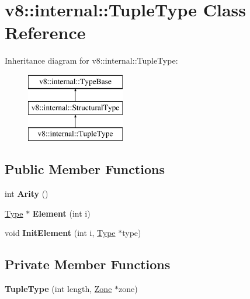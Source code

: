 \hypertarget{classv8_1_1internal_1_1_tuple_type}{}\section{v8\+:\+:internal\+:\+:Tuple\+Type Class Reference}
\label{classv8_1_1internal_1_1_tuple_type}
Inheritance diagram for v8\+:\+:internal\+:\+:Tuple\+Type\+:\begin{figure}[H]
\begin{center}
\leavevmode
\includegraphics[height=3.000000cm]{classv8_1_1internal_1_1_tuple_type}
\end{center}
\end{figure}
\subsection*{Public Member Functions}
\begin{DoxyCompactItemize}
\item 
int {\bfseries Arity} ()\hypertarget{classv8_1_1internal_1_1_tuple_type_acf485a5f8190e56ef98b38aab2015551}{}\label{classv8_1_1internal_1_1_tuple_type_acf485a5f8190e56ef98b38aab2015551}

\item 
\hyperlink{classv8_1_1internal_1_1_type}{Type} $\ast$ {\bfseries Element} (int i)\hypertarget{classv8_1_1internal_1_1_tuple_type_a410703a0815a1ec77be374249e8dd8b3}{}\label{classv8_1_1internal_1_1_tuple_type_a410703a0815a1ec77be374249e8dd8b3}

\item 
void {\bfseries Init\+Element} (int i, \hyperlink{classv8_1_1internal_1_1_type}{Type} $\ast$type)\hypertarget{classv8_1_1internal_1_1_tuple_type_a6c8e4117ba438ecd1252a4ab9b59e1f1}{}\label{classv8_1_1internal_1_1_tuple_type_a6c8e4117ba438ecd1252a4ab9b59e1f1}

\end{DoxyCompactItemize}
\subsection*{Private Member Functions}
\begin{DoxyCompactItemize}
\item 
{\bfseries Tuple\+Type} (int length, \hyperlink{classv8_1_1internal_1_1_zone}{Zone} $\ast$zone)\hypertarget{classv8_1_1internal_1_1_tuple_type_a5d405fb578af7021675e1cb5fca9d010}{}\label{classv8_1_1internal_1_1_tuple_type_a5d405fb578af7021675e1cb5fca9d010}

\end{DoxyCompactItemize}

